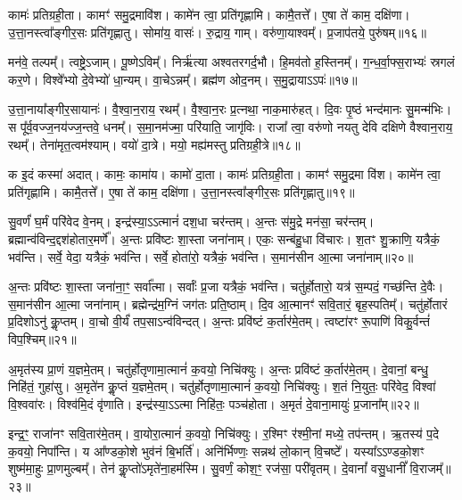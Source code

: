 कामः॑ प्रतिग्रही॒ता। 
कामꣳ॑ समु॒द्रमावि॑श। 
कामे॑न त्वा॒ प्रति॑गृह्णामि। 
कामै॒तत्ते᳚। 
ए॒षा ते॑ काम॒ दक्षि॑णा। 
उ॒त्ता॒नस्त्वा᳚ङ्गीर॒सः प्रति॑गृह्णातु। 
सोमा॑य॒ वासः॑। 
रु॒द्राय॒ गाम्। 
वरु॑णा॒याश्वम्᳚। 
प्र॒जाप॑तये॒ पुरु॑षम्॥१६॥\ip%

मन॑वे॒ तल्पम्᳚। 
त्वष्ट्रे॒ऽजाम्। 
पू॒ष्णेऽविम्᳚। 
निर्\mbox{}ऋ॑त्या अश्वतरगर्द॒भौ। 
हि॒मव॑तो ह॒स्तिनम्᳚। 
ग॒न्ध॒र्वा॒फ्स॒राभ्यः॑ स्रगलं कर॒णे। 
विश्वे᳚भ्यो दे॒वेभ्यो॑ धा॒न्यम्। 
वा॒चेऽन्नम्᳚। 
ब्रह्म॑ण ओद॒नम्। 
स॒मु॒द्रायाऽऽपः॑॥१७॥\ip

उ॒त्ता॒नाया᳚ङ्गीर॒सायानः॑। 
वै॒श्वा॒न॒राय॒ रथम्᳚। 
वै॒श्वा॒न॒रः प्र॒त्नथा॒ नाक॒मारु॑हत्। 
दि॒वः पृ॒ष्ठं भन्द॑मानः सु॒मन्म॑भिः। 
स पू᳚र्व॒वज्ज॒नय॑ज्ज॒न्तवे॒ धनम्᳚। 
स॒मा॒नम॑ज्मा॒ परि॑याति॒ जागृ॑विः। 
राजा᳚ त्वा॒ वरु॑णो नयतु देवि दक्षिणे वैश्वान॒राय॒ रथम्᳚। 
तेना॑मृत॒त्वम॑श्याम्। 
वयो॑ दा॒त्रे। 
मयो॒ मह्य॑मस्तु प्रतिग्रही॒त्रे॥१८॥\ip

क इ॒दं कस्मा॑ अदात्। 
कामः॒ कामा॑य। 
कामो॑ दा॒ता। 
कामः॑ प्रतिग्रही॒ता। 
कामꣳ॑ समु॒द्रमा वि॑श। 
कामे॑न त्वा॒ प्रति॑गृह्णामि। 
कामै॒तत्ते᳚। 
ए॒षा ते॑ काम॒ दक्षि॑णा। 
उ॒त्ता॒नस्त्वा᳚ङ्गीर॒सः प्रति॑गृह्णातु॥१९॥\ip
\anuvakamend[दा॒ता पुरु॑ष॒मपः॑ प्रतिग्रही॒त्रे नव॑ च]

सु॒वर्णं॑ घ॒र्मं परि॑वेद वे॒नम्। 
इन्द्र॑स्या॒ऽऽत्मानं॑ दश॒धा चर॑न्तम्। 
अ॒न्तः स॑मु॒द्रे मन॑सा॒ चर॑न्तम्। 
ब्रह्मान्व॑विन्द॒द्दश॑होतार॒मर्णे᳚। 
अ॒न्तः प्रवि॑ष्टः  शा॒स्ता जना॑नाम्। 
एकः॒ सन्ब॑हु॒धा वि॑चारः। 
श॒तꣳ शु॒क्राणि॒ यत्रैकं॒ भव॑न्ति। 
सर्वे॒ वेदा॒ यत्रैकं॒ भव॑न्ति। 
सर्वे॒ होता॑रो॒ यत्रैकं॒ भव॑न्ति। 
स॒मान॑सीन आ॒त्मा जना॑नाम्॥२०॥\ip%

अ॒न्तः प्रवि॑ष्टः  शा॒स्ता जना॑ना॒ꣳ॒ सर्वा᳚त्मा। 
सर्वाः᳚ प्र॒जा यत्रैकं॒ भव॑न्ति। 
चतु॑र्\mbox{}होतारो॒ यत्र॑ स॒म्पदं॒ गच्छ॑न्ति दे॒वैः। 
स॒मान॑सीन आ॒त्मा जना॑नाम्। 
ब्रह्मेन्द्र॑म॒ग्निं जग॑तः प्रति॒ष्ठाम्। 
दि॒व आ॒त्मानꣳ॑ सवि॒तारं॒ बृह॒स्पतिम्᳚। 
चतु॑र्\mbox{}होतारं प्र॒दिशोऽनु॑ कॢ॒प्तम्। 
वा॒चो वी॒र्यं॑ तप॒साऽन्व॑विन्दत्। 
अ॒न्तः प्रवि॑ष्टं क॒र्तार॑मे॒तम्। 
त्वष्टा॑रꣳ रू॒पाणि॑ विकु॒र्वन्तं॑ विप॒श्चिम्॥२१॥\ip

अ॒मृत॑स्य प्रा॒णं य॒ज्ञमे॒तम्। 
चतु॑र्\mbox{}होतृणामा॒त्मानं॑ क॒वयो॒ निचि॑क्युः। 
अ॒न्तः प्रवि॑ष्टं क॒र्तार॑मे॒तम्। 
दे॒वानां॒ बन्धु॒ निहि॑तं॒ गुहा॑सु। 
अ॒मृते॑न कॢ॒प्तं य॒ज्ञमे॒तम्। 
चतु॑र्\mbox{}होतृणामा॒त्मानं॑ क॒वयो॒ निचि॑क्युः। 
श॒तं नि॒युतः॒ परि॑वेद॒ विश्वा॑ वि॒श्ववा॑रः। 
विश्व॑मि॒दं वृ॑णाति। 
इन्द्र॑स्या॒ऽऽत्मा निहि॑तः॒ पञ्च॑होता। 
अ॒मृतं॑ दे॒वाना॒मायुः॑ प्र॒जाना᳚म्॥२२॥\ip%

इन्द्र॒ꣳ॒ राजा॑नꣳ सवि॒तार॑मे॒तम्। 
वा॒योरा॒त्मानं॑ क॒वयो॒ निचि॑क्युः। 
र॒श्मिꣳ र॑श्मी॒नां मध्ये॒ तप॑न्तम्। 
ऋ॒तस्य॑ प॒दे क॒वयो॒ निपा᳚न्ति। 
य आ᳚ण्डको॒शे भुव॑नं बि॒भर्ति॑। 
अनि॑र्भिण्णः॒ सन्नथ॑ लो॒कान् वि॒चष्टे᳚। 
यस्या᳚ऽऽण्डको॒शꣳ शुष्म॑मा॒हुः प्रा॒णमुल्बम्᳚। 
तेन॑ कॢ॒प्तो॑ऽमृते॑ना॒हम॑स्मि। 
सु॒वर्णं॒ कोश॒ꣳ॒ रज॑सा॒ परी॑वृतम्। 
दे॒वानां᳚ वसु॒धानीं᳚  वि॒राजम्᳚॥२३॥\ip%

